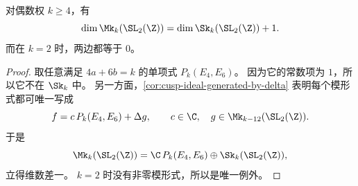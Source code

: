 \begin{corollary}[维数差一的简洁证明]
\label{cor:dimMk-dimSk-plus-one-short}
对偶数权 $k\ge 4$，有
\[
  \dim \Mk_k(\SL_2(\Z))=\dim \Sk_k(\SL_2(\Z))+1.
\]
而在 $k=2$ 时，两边都等于 $0$。
\end{corollary}

\begin{proof}
取任意满足 $4a+6b=k$ 的单项式 $P_k(E_4,E_6)$。
因为它的常数项为 $1$，所以它不在 $\Sk_k$ 中。
另一方面，\cref{cor:cusp-ideal-generated-by-delta} 表明每个模形式都可唯一写成
\[
  f=c\,P_k(E_4,E_6)+\Delta g,
  \qquad c\in \C,
  \quad g\in \Mk_{k-12}(\SL_2(\Z)).
\]
于是
\[
  \Mk_k(\SL_2(\Z))=\C\,P_k(E_4,E_6)\oplus \Sk_k(\SL_2(\Z)),
\]
立得维数差一。
$k=2$ 时没有非零模形式，所以是唯一例外。
\end{proof}
